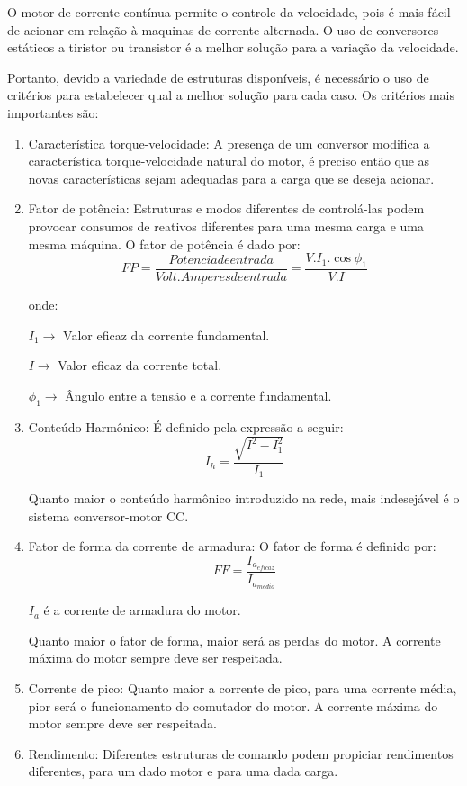 O motor de corrente contínua permite o controle da velocidade, pois é mais fácil de acionar em relação à maquinas de corrente alternada. O uso de conversores estáticos a tiristor ou transistor é a melhor solução para a variação da velocidade.

Portanto, devido a variedade de estruturas disponíveis, é necessário o uso de critérios para estabelecer qual a melhor solução para cada caso. Os critérios mais importantes são:

\begin{enumerate}
    \item Característica torque-velocidade: A presença de um conversor modifica a característica torque-velocidade natural do motor, é preciso então que as novas características sejam adequadas para a carga que se deseja acionar.
    
    \item Fator de potência: Estruturas e modos diferentes de controlá-las podem provocar consumos de reativos diferentes para uma mesma carga e uma mesma máquina. O fator de potência é dado por:
    \begin{equation*}
        FP = \frac{Potencia de entrada}{Volt.Amperes de entrada} = \frac{V.I_{1}.\cos{\phi_{1}}}{V.I}
    \end{equation*}
    
    onde:
    
    $I_{1} \rightarrow$ Valor eficaz da corrente fundamental.
    
    $I \rightarrow$ Valor eficaz da corrente total.
    
    $\phi_{1}  \rightarrow$  Ângulo entre a tensão e a corrente fundamental.
    
    \item Conteúdo Harmônico: É definido pela expressão a seguir:
    \[I_{h} = \frac{\sqrt{I^{2} - I_{1}^{2}}}{I_{1}}\]
    
    Quanto maior o conteúdo harmônico introduzido na rede, mais indesejável é o sistema conversor-motor CC.
    
    \item Fator de forma da corrente de armadura: O fator de forma é definido por:
    \begin{equation*}
        FF = \frac{I_{a_{eficaz}}}{I_{a_{medio}}}
    \end{equation*}
    
    $I_{a}$ é a corrente de armadura do motor.
    
    Quanto maior o fator de forma, maior será as perdas do motor. A corrente máxima do motor sempre deve ser respeitada.
    
    \item Corrente de pico: Quanto maior a corrente de pico, para uma corrente média, pior será o funcionamento do comutador do motor. A corrente máxima do motor sempre deve ser respeitada.
    
    \item Rendimento: Diferentes estruturas de comando podem propiciar rendimentos diferentes, para um dado motor e para uma dada carga.
\end{enumerate}

